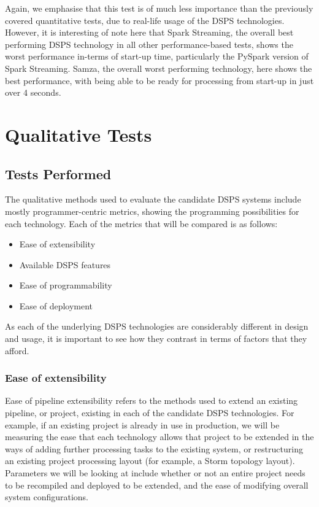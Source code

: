 Again, we emphasise that this test is of much less importance than the previously covered quantitative tests, due to real-life usage
of the DSPS technologies. However, it is interesting of note here that Spark Streaming, the overall best performing
DSPS technology in all other performance-based tests, shows the worst performance in-terms of start-up time, particularly
the PySpark version of Spark Streaming. Samza, the overall worst performing technology, here shows the best performance,
with being able to be ready for processing from start-up in just over 4 seconds.




\section{Qualitative Tests} %
\label{sub:qualitative_tests}

\subsection{Tests Performed} %
\label{ssub:tests_performed}

The qualitative methods used to evaluate the candidate DSPS systems include mostly programmer-centric metrics, showing the
programming possibilities for each technology. Each of the metrics that will be compared is as follows:

\begin{itemize}
  \item Ease of extensibility
  \item Available DSPS features
  \item Ease of programmability
  \item Ease of deployment
\end{itemize}

As each of the underlying DSPS technologies are considerably different in design and usage, it is important to see how
they contrast in terms of factors that they afford.

\subsubsection{Ease of extensibility}

Ease of pipeline extensibility refers to the methods used to extend an existing pipeline, or project, existing in each
of the candidate DSPS technologies. For example, if an existing project is already in use in production, we will be measuring the
ease that each technology allows that project to be extended in the ways of adding further processing tasks to the
existing system, or restructuring an existing project processing layout (for example, a Storm topology layout). Parameters
we will be looking at include whether or not an entire project needs to be recompiled and deployed to be extended, and the
ease of modifying overall system configurations.


